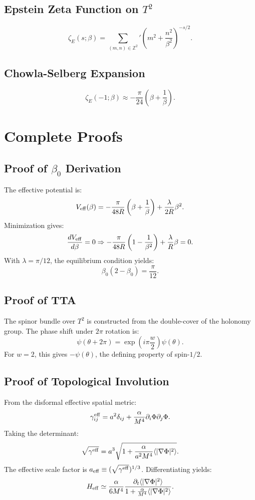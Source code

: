 \documentclass[12pt,oneside]{book}
\begin{document}
\subsection{Epstein Zeta Function on $T^2$}
\[
\zeta_E(s;\beta) = \sum_{(m,n)\in\mathbb{Z}^2}' \left(m^2 + \frac{n^2}{\beta^2}\right)^{-s/2}.
\]

\subsection{Chowla-Selberg Expansion}
\[
\zeta_E(-1;\beta) \approx -\frac{\pi}{24}\left(\beta + \frac{1}{\beta}\right).
\]

\section{Complete Proofs}

\subsection{Proof of $\beta_0$ Derivation}
The effective potential is:
\[
V_{\rm eff}(\beta) = -\frac{\pi}{48R}\left(\beta + \frac{1}{\beta}\right) + \frac{\lambda}{2R}\beta^2.
\]
Minimization gives:
\[
\frac{dV_{\rm eff}}{d\beta} = 0 \Rightarrow -\frac{\pi}{48R}\left(1 - \frac{1}{\beta^2}\right) + \frac{\lambda}{R}\beta = 0.
\]
With $\lambda = \pi/12$, the equilibrium condition yields:
\[
\beta_0(2 - \beta_0) = \frac{\pi}{12}.
\]

\subsection{Proof of TTA}
The spinor bundle over $T^2$ is constructed from the double-cover of the holonomy group. The phase shift under $2\pi$ rotation is:
\[
\psi(\theta + 2\pi) = \exp\left(i\pi \frac{w}{2}\right)\psi(\theta).
\]
For $w = 2$, this gives $-\psi(\theta)$, the defining property of spin-$1/2$.

\subsection{Proof of Topological Involution}
From the disformal effective spatial metric:
\[
\gamma_{ij}^{\rm eff} = a^2\delta_{ij} + \frac{\alpha}{M^4}\partial_i\Phi\partial_j\Phi.
\]
Taking the determinant:
\[
\sqrt{\gamma^{\rm eff}} = a^3\sqrt{1 + \frac{\alpha}{a^2M^4}\langle|\nabla\Phi|^2\rangle}.
\]
The effective scale factor is $a_{\rm eff} \equiv (\sqrt{\gamma^{\rm eff}})^{1/3}$. Differentiating yields:
\[
H_{\rm eff} \simeq \frac{\alpha}{6M^4}\frac{\partial_t\langle|\nabla\Phi|^2\rangle}{1 + \frac{\alpha}{M^4}\langle|\nabla\Phi|^2\rangle}.
\]
\end{document}
